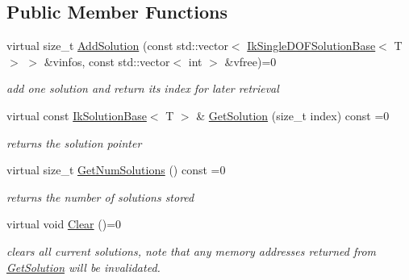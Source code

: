 \subsection*{Public Member Functions}
\begin{DoxyCompactItemize}
\item 
virtual size\-\_\-t \hyperlink{classikfast_1_1IkSolutionListBase_a9d862f550472c2fa15189946b12222bf}{Add\-Solution} (const std\-::vector$<$ \hyperlink{classikfast_1_1IkSingleDOFSolutionBase}{Ik\-Single\-D\-O\-F\-Solution\-Base}$<$ T $>$ $>$ \&vinfos, const std\-::vector$<$ int $>$ \&vfree)=0
\begin{DoxyCompactList}\small\item\em add one solution and return its index for later retrieval \end{DoxyCompactList}\item 
\hypertarget{classikfast_1_1IkSolutionListBase_a540d8c85b5be635ea671ef7ddc0eb9c0}{virtual const \hyperlink{classikfast_1_1IkSolutionBase}{Ik\-Solution\-Base}$<$ T $>$ \& \hyperlink{classikfast_1_1IkSolutionListBase_a540d8c85b5be635ea671ef7ddc0eb9c0}{Get\-Solution} (size\-\_\-t index) const =0}\label{classikfast_1_1IkSolutionListBase_a540d8c85b5be635ea671ef7ddc0eb9c0}

\begin{DoxyCompactList}\small\item\em returns the solution pointer \end{DoxyCompactList}\item 
\hypertarget{classikfast_1_1IkSolutionListBase_a5f4a2191825f1d2aad3468daf94d575f}{virtual size\-\_\-t \hyperlink{classikfast_1_1IkSolutionListBase_a5f4a2191825f1d2aad3468daf94d575f}{Get\-Num\-Solutions} () const =0}\label{classikfast_1_1IkSolutionListBase_a5f4a2191825f1d2aad3468daf94d575f}

\begin{DoxyCompactList}\small\item\em returns the number of solutions stored \end{DoxyCompactList}\item 
\hypertarget{classikfast_1_1IkSolutionListBase_a9940fe21cfa0a67c1a21a672696c5cb5}{virtual void \hyperlink{classikfast_1_1IkSolutionListBase_a9940fe21cfa0a67c1a21a672696c5cb5}{Clear} ()=0}\label{classikfast_1_1IkSolutionListBase_a9940fe21cfa0a67c1a21a672696c5cb5}

\begin{DoxyCompactList}\small\item\em clears all current solutions, note that any memory addresses returned from \hyperlink{classikfast_1_1IkSolutionListBase_a540d8c85b5be635ea671ef7ddc0eb9c0}{Get\-Solution} will be invalidated. \end{DoxyCompactList}\end{DoxyCompactItemize}


